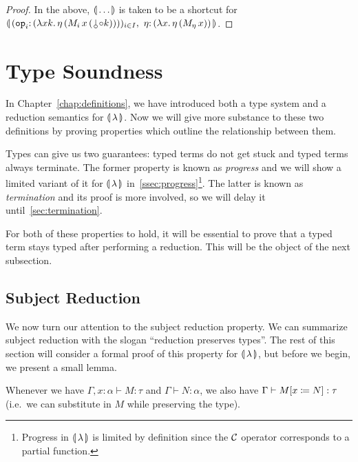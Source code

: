 \begin{proof}
  In the above, $\llparenthesis \, \ldots \, \rrparenthesis$ is taken to be a shortcut for
  $\banana{(\onto{\op{op}_i}{(\lam{x
        k}{\ap{\eta}{(\ap{\ap{M_i}{x}}{(\cherry \compop k)})}})})_{i \in I},\
    \onto{\eta}{(\lam{x}{\etaE{(\ap{M_\eta}{x})}})}}$.
\end{proof}


\section{Type Soundness}
\label{sec:type-soundness}

In Chapter~\ref{chap:definitions}, we have introduced both a type system
and a reduction semantics for $\llparenthesis \, \lambda \, \rrparenthesis$. Now we will give more
substance to these two definitions by proving properties which outline the
relationship between them.

Types can give us two guarantees: typed terms do not get stuck and typed
terms always terminate. The former property is known as \emph{progress} and
we will show a limited variant of it for $\llparenthesis \, \lambda \, \rrparenthesis$
in~\ref{ssec:progress}\footnote{Progress in $\llparenthesis \, \lambda \, \rrparenthesis$ is limited
  by definition since the $\mathcal{C}$ operator corresponds to a partial
  function.}. The latter is known as \emph{termination} and its proof is
more involved, so we will delay it until~\ref{sec:termination}.

For both of these properties to hold, it will be essential to prove that a
typed term stays typed after performing a reduction. This will be the
object of the next subsection.


\subsection{Subject Reduction}
\label{ssec:subject-reduction}

We now turn our attention to the subject reduction property. We can
summarize subject reduction with the slogan ``reduction preserves
types''. The rest of this section will consider a formal proof of this
property for $\llparenthesis \, \lambda \, \rrparenthesis$, but before we begin, we present a small
lemma.

\begin{lemma}\label{lem:substitution-types}
  
  Whenever we have $\Gamma, x : \alpha \vdash M : \tau$ and
  $\Gamma \vdash N : \alpha$, we also have
  $\Gamma \vdash M[x \coloneqq N] : \tau$ (i.e.\ we can substitute in $M$
  while preserving the type).
\end{lemma}

